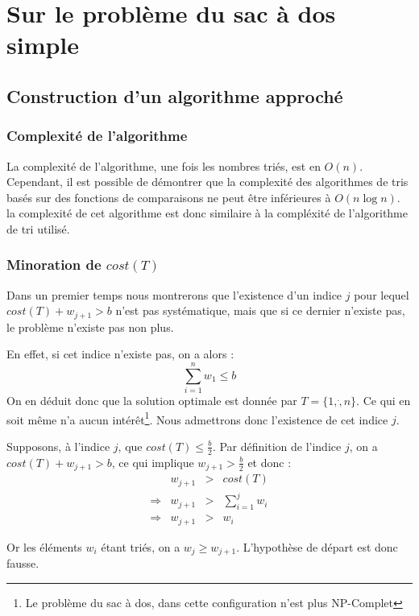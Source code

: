 \section{Sur le problème du sac à dos simple}

\subsection{Construction d'un algorithme approché}

\subsubsection{Complexité de l'algorithme}

La complexité de l'algorithme, une fois les nombres triés, est en $O(n)$. Cependant, il est possible
de démontrer que la complexité des algorithmes de tris basés sur des fonctions de comparaisons ne
peut être inférieures à $O(n\log n)$. la complexité de cet algorithme est donc similaire à la
compléxité de l'algorithme de tri utilisé.

\subsubsection{Minoration de $cost(T)$}

Dans un premier temps nous montrerons que l'existence d'un indice $j$ pour lequel $cost(T) + w_{j+1}
> b$ n'est pas systématique, mais que si ce dernier n'existe pas, le problème n'existe pas non plus.

En effet, si cet indice n'existe pas, on a alors : 
$$ \sum_{i=1}^n w_1 \leq b $$
On en déduit donc que la solution optimale est donnée par $ T = \{ 1, \dot, n \} $. Ce qui en soit
même n'a aucun intérêt\footnote{Le problème du sac à dos, dans cette configuration n'est plus
NP-Complet}. Nous admettrons donc l'existence de cet indice $j$.

Supposons, à l'indice $j$, que $cost(T) \leq \frac{b}{2}$. Par définition de l'indice $j$, on a
$cost(T) + w_{j+1} > b$, ce qui implique $w_{j+1} > \frac{b}{2}$ et donc : $$
\begin{array}{lrcl}
	& w_{j+1} & > & cost(T) \\
	\Rightarrow & w_{j+1} & > & \sum_{i=1}^j w_i \\
	\Rightarrow & w_{j+1} & > & w_i
\end{array}
$$

Or les éléments $w_i$ étant triés, on a $w_j \geq w_{j+1}$. L'hypothèse de départ est donc fausse.

